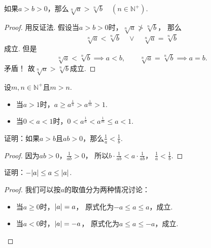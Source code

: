 \begin{theorem}
如果\(a>b>0\)，那么\(\sqrt[n]{a} > \sqrt[n]{b} \quad (n\in\mathbb{N}^+)\).
\begin{proof}
用反证法.
假设当\(a>b>0\)时，\(\sqrt[n]{a} \ngtr \sqrt[n]{b}\)，
那么\[
	\sqrt[n]{a} < \sqrt[n]{b}
	\quad\lor\quad
	\sqrt[n]{a} = \sqrt[n]{b}
\]成立.
但是\[
	\sqrt[n]{a} < \sqrt[n]{b} \implies a<b,
	\qquad
	\sqrt[n]{a} = \sqrt[n]{b} \implies a=b.
\]矛盾！
故\(\sqrt[n]{a}>\sqrt[n]{b}\)成立.
\end{proof}
\end{theorem}

\begin{theorem}
设\(m,n\in\mathbb{N}^+\)且\(m>n\).
\begin{itemize}
	\item 当\(a>1\)时，\(a \geq a^{\frac1n} > a^{\frac1m} > 1\).
	\item 当\(0<a<1\)时，\(0 < a^{\frac1n} < a^{\frac1m} \leq a < 1\).
\end{itemize}
\end{theorem}

\begin{example}
证明：如果\(a > b\)且\(ab > 0\)，那么\(\frac{1}{a} < \frac{1}{b}\).
\begin{proof}
因为\(ab > 0\)，\(\frac{1}{ab} > 0\)，
所以\(b \cdot \frac{1}{ab} < a \cdot \frac{1}{ab}\)，
\(\frac{1}{a} < \frac{1}{b}\).
\end{proof}
\end{example}

\begin{example}
证明：\(-\abs{a} \leq a \leq \abs{a}\).
\begin{proof}
我们可以按\(a\)的取值分为两种情况讨论：
\begin{itemize}
	\item 当\(a \geq 0\)时，\(\abs{a}=a\)，
	原式化为\(-a \leq a \leq a\)，成立.
	\item 当\(a < 0\)时，\(\abs{a}=-a\)，
	原式化为\(a \leq a \leq -a\)，成立.
	\qedhere
\end{itemize}
\end{proof}
\end{example}
